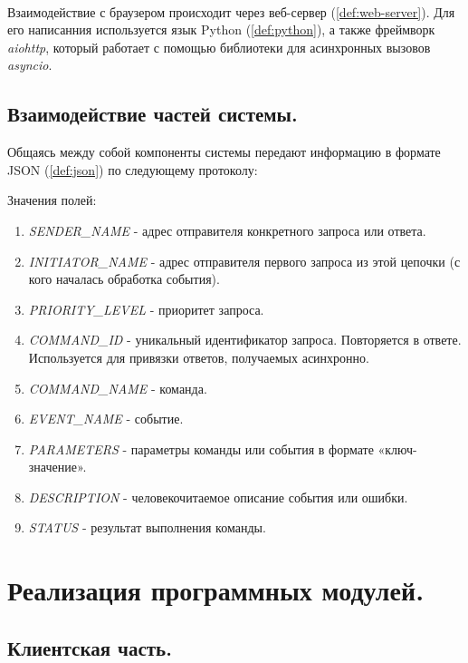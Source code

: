 ~\

Взаимодействие с браузером происходит через веб-сервер (\ref{def:web-server}). Для его написанния используется язык
Python (\ref{def:python}), а также фреймворк \textit{aiohttp}, который работает с помощью библиотеки для асинхронных вызовов
\textit{asyncio}.

\subsection{Взаимодействие частей системы.}

Общаясь между собой компоненты системы передают информацию в формате JSON (\ref{def:json}) по следующему протоколу:


Значения полей:
\begin{enumerate}
    \item \textit{SENDER\_NAME} - адрес отправителя конкретного запроса или ответа.
    \item \textit{INITIATOR\_NAME} - адрес отправителя первого запроса из этой цепочки (с кого началась обработка события).
    \item \textit{PRIORITY\_LEVEL} - приоритет запроса.
    \item \textit{COMMAND\_ID} - уникальный идентификатор запроса. Повторяется в ответе.
    Используется для привязки ответов, получаемых асинхронно.
    \item \textit{COMMAND\_NAME} - команда.
    \item \textit{EVENT\_NAME} - событие.
    \item \textit{PARAMETERS} - параметры команды или события в формате «ключ-значение».
    \item \textit{DESCRIPTION} - человекочитаемое описание события или ошибки.
    \item \textit{STATUS} - результат выполнения команды.
\end{enumerate}

\clearpage

\section{Реализация программных модулей.}

\subsection{Клиентская часть.}

